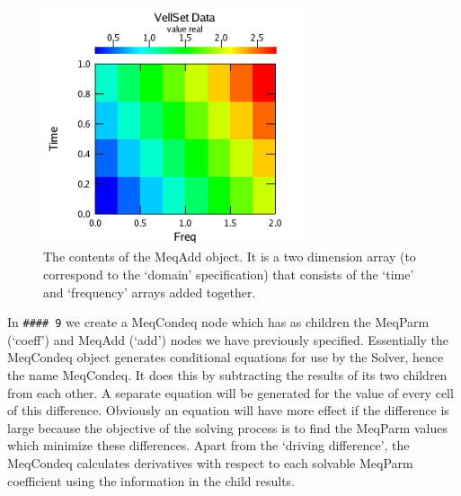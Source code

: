 \documentclass[10pt]{article}
\begin{document}
\begin{figure}
{\par\centering
\includegraphics[width=3.0in]{Figures/add}
\par}
\caption {The contents of the MeqAdd object. It is a two dimension array (to
correspond to the `domain' specification) that consists of the `time' and
`frequency' arrays added together.}
\label{fig:add}
\end{figure}

In {\tt \#\#\#\# 9} we create a MeqCondeq node which has as 
children the MeqParm (`coeff') and MeqAdd (`add') nodes we have 
previously specified. Essentially the MeqCondeq object generates conditional
equations for use by the Solver, hence the name MeqCondeq. It does this
by subtracting the results of its two children from each other. A separate
equation will be generated for the value of every cell of this difference.
Obviously an equation will have more effect if the difference is large
because the objective of the solving process is to find the MeqParm
values which minimize these differences. Apart from the `driving difference',
the MeqCondeq calculates derivatives with respect to each solvable
MeqParm coefficient using the information in the child results.
\end{document}
